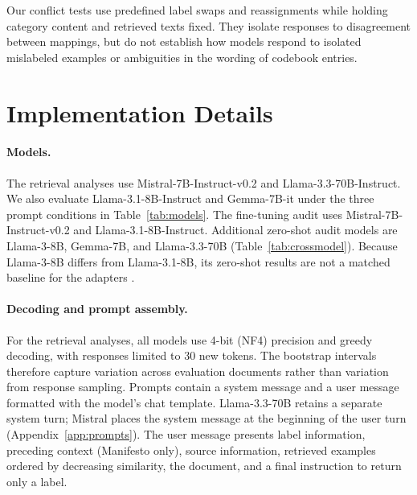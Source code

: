 \documentclass[11pt]{article}
\begin{document}
Our conflict tests use predefined label swaps and reassignments while holding category content and retrieved texts fixed. They isolate responses to disagreement between mappings, but do not establish how models respond to isolated mislabeled examples or ambiguities in the wording of codebook entries.




\appendix


\makeatletter
\setlength{\@dblfptop}{0pt}
\setlength{\@dblfpsep}{12pt}
\setlength{\@dblfpbot}{0pt plus 1fil}
\makeatother

\section{Implementation Details}
\label{app:implementation}

\paragraph{Models.}
The retrieval analyses use Mistral-7B-Instruct-v0.2 and Llama-3.3-70B-Instruct. We also evaluate Llama-3.1-8B-Instruct and Gemma-7B-it under the three prompt conditions in Table~\ref{tab:models}. The fine-tuning audit uses Mistral-7B-Instruct-v0.2 and Llama-3.1-8B-Instruct. Additional zero-shot audit models are Llama-3-8B, Gemma-7B, and Llama-3.3-70B (Table~\ref{tab:crossmodel}). Because Llama-3-8B differs from Llama-3.1-8B, its zero-shot results are not a matched baseline for the adapters \citep{grattafiori2024llama3}.

\paragraph{Decoding and prompt assembly.}
For the retrieval analyses, all models use 4-bit (NF4) precision \citep{dettmers2023qlora} and greedy decoding, with responses limited to 30 new tokens. The bootstrap intervals therefore capture variation across evaluation documents rather than variation from response sampling. Prompts contain a system message and a user message formatted with the model's chat template. Llama-3.3-70B retains a separate system turn; Mistral places the system message at the beginning of the user turn (Appendix~\ref{app:prompts}). The user message presents label information, preceding context (Manifesto only), source information, retrieved examples ordered by decreasing similarity, the document, and a final instruction to return only a label.
\end{document}
